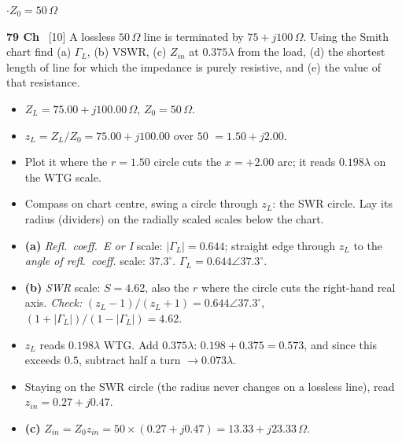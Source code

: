 {\color{sub}\footnotesize {} \gap$\cdot$\gap $Z_0 = 50\,\Omega$}

\begin{asked}{\textbf{79 Ch} \ [10]}
A lossless $50\,\Omega$ line is terminated by $75+j100\,\Omega$. Using the Smith chart find (a) $\Gamma_L$, (b) VSWR, (c) $Z_{in}$ at $0.375\lambda$ from the load, (d) the shortest length of line for which the impedance is purely resistive, and (e) the value of that resistance.
\end{asked}
\begin{itemize}
  \item $Z_L = 75.00 + j100.00\,\Omega$, $Z_0 = 50\,\Omega$.
\end{itemize}
\begin{itemize}
  \item $z_L = Z_L/Z_0 = 75.00 + j100.00$ over $50$ $=1.50 + j2.00$.
  \item Plot it where the $r = 1.50$ circle cuts the $x = +2.00$ arc; it reads $0.198\lambda$ on the WTG scale.
\end{itemize}
\begin{itemize}
  \item Compass on chart centre, swing a circle through $z_L$: the SWR circle. Lay its radius (dividers) on the radially scaled scales below the chart.
  \item \textbf{(a)} \emph{Refl.\ coeff.\ E or I} scale: $|\Gamma_L| = 0.644$; straight edge through $z_L$ to the \emph{angle of refl.\ coeff.} scale: $37.3^\circ$. $\boxed{\Gamma_L = 0.644\angle 37.3^\circ}$.
  \item \textbf{(b)} \emph{SWR} scale: $\boxed{S = 4.62}$, also the $r$ where the circle cuts the right-hand real axis. \textit{Check:} $(z_L-1)/(z_L+1) = 0.644\angle 37.3^\circ$, $(1+|\Gamma_L|)/(1-|\Gamma_L|) = 4.62$.
\end{itemize}
\begin{itemize}
  \item $z_L$ reads $0.198\lambda$ WTG. Add $0.375\lambda$: $0.198 + 0.375 = 0.573$, and since this exceeds $0.5$, subtract half a turn $\rightarrow 0.073\lambda$.
  \item Staying on the SWR circle (the radius never changes on a lossless line), read $z_{in} = 0.27 + j0.47$.
  \item \textbf{(c)} $Z_{in} = Z_0 z_{in} = 50 \times (0.27 + j0.47) = \boxed{13.33 + j23.33\,\Omega}$.
\end{itemize}
